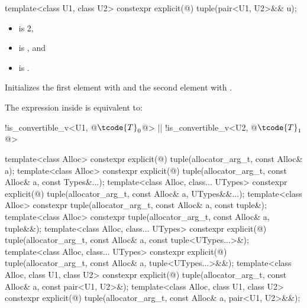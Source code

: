 %
%
\begin{itemdecl}
template<class U1, class U2> constexpr explicit(@\seebelow@) tuple(pair<U1, U2>&& u);
\end{itemdecl}

\begin{itemdescr}
\pnum
\constraints
\begin{itemize}
\item {} is 2,
\item {} is , and
\item {} is .
\end{itemize}

\pnum
\effects
Initializes the first element with
 and the
second element with .

\pnum
\remarks
The expression inside  is equivalent to:
\begin{codeblock}
!is_convertible_v<U1, @$\tcode{T}_0$@> || !is_convertible_v<U2, @$\tcode{T}_1$@>
\end{codeblock}
\end{itemdescr}

%
\begin{itemdecl}
template<class Alloc>
  constexpr explicit(@\seebelow@)
    tuple(allocator_arg_t, const Alloc& a);
template<class Alloc>
  constexpr explicit(@\seebelow@)
    tuple(allocator_arg_t, const Alloc& a, const Types&...);
template<class Alloc, class... UTypes>
  constexpr explicit(@\seebelow@)
    tuple(allocator_arg_t, const Alloc& a, UTypes&&...);
template<class Alloc>
  constexpr tuple(allocator_arg_t, const Alloc& a, const tuple&);
template<class Alloc>
  constexpr tuple(allocator_arg_t, const Alloc& a, tuple&&);
template<class Alloc, class... UTypes>
  constexpr explicit(@\seebelow@)
    tuple(allocator_arg_t, const Alloc& a, const tuple<UTypes...>&);
template<class Alloc, class... UTypes>
  constexpr explicit(@\seebelow@)
    tuple(allocator_arg_t, const Alloc& a, tuple<UTypes...>&&);
template<class Alloc, class U1, class U2>
  constexpr explicit(@\seebelow@)
    tuple(allocator_arg_t, const Alloc& a, const pair<U1, U2>&);
template<class Alloc, class U1, class U2>
  constexpr explicit(@\seebelow@)
    tuple(allocator_arg_t, const Alloc& a, pair<U1, U2>&&);
\end{itemdecl}

